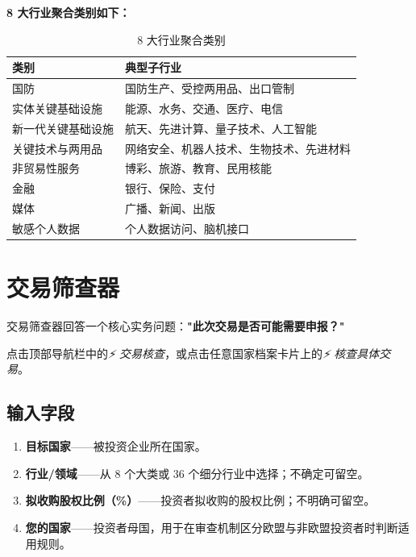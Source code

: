 \documentclass[12pt,a4paper]{article}
\newcommand{\uielem}[1]{\textit{#1}}
\begin{document}
\textbf{8 大行业聚合类别如下：}

\begin{table}[h]
\centering
\begin{tabularx}{\linewidth}{lX}
\toprule
\textbf{类别} & \textbf{典型子行业} \\
\midrule
国防 & 国防生产、受控两用品、出口管制 \\
实体关键基础设施 & 能源、水务、交通、医疗、电信 \\
新一代关键基础设施 & 航天、先进计算、量子技术、人工智能 \\
关键技术与两用品 & 网络安全、机器人技术、生物技术、先进材料 \\
非贸易性服务 & 博彩、旅游、教育、民用核能 \\
金融 & 银行、保险、支付 \\
媒体 & 广播、新闻、出版 \\
敏感个人数据 & 个人数据访问、脑机接口 \\
\bottomrule
\end{tabularx}
\caption{8 大行业聚合类别}
\end{table}

\section{交易筛查器}
\label{sec:screener}

交易筛查器回答一个核心实务问题：\textbf{"此次交易是否可能需要申报？"}

\begin{tipbox}[打开方式]
点击顶部导航栏中的\uielem{⚡ 交易核查}，或点击任意国家档案卡片上的\uielem{⚡ 核查具体交易}。
\end{tipbox}

\subsection{输入字段}

\begin{enumerate}
  \item \textbf{目标国家}——被投资企业所在国家。
  \item \textbf{行业/领域}——从 8 个大类或 36 个细分行业中选择；不确定可留空。
  \item \textbf{拟收购股权比例（\%）}——投资者拟收购的股权比例；不明确可留空。
  \item \textbf{您的国家}——投资者母国，用于在审查机制区分欧盟与非欧盟投资者时判断适用规则。
\end{enumerate}
\end{document}

